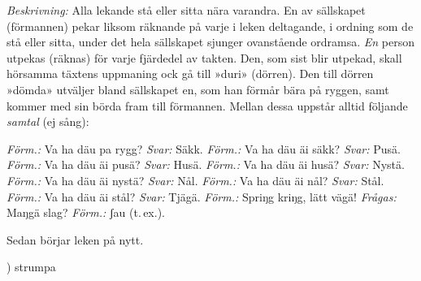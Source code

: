 \vspace{10mm}

\textit{Beskrivning:} Alla lekande stå eller sitta nära varandra. En
av sällskapet (förmannen) pekar liksom räknande på varje i leken
deltagande, i ordning som de stå eller sitta, under det hela sällskapet
sjunger ovanstående ordramsa. \textit{En} person utpekas (räknas)
för varje fjärdedel av takten. Den, som sist blir utpekad, skall
hörsamma täxtens uppmaning ock gå till »duri» (dörren). Den
till dörren »dömda» utväljer bland sällskapet en, som han förmår
bära på ryggen, samt kommer med sin börda fram till förmannen.
Mellan dessa uppstår alltid följande \textit{samtal} (ej sång):

\begin{multicols}{2}
\begin{flushleft}
\textit{Förm.:} Va ha däu pa rygg?\break
\textit{Svar:} Säkk.\break
\textit{Förm.:} Va ha däu äi säkk?\break
\textit{Svar:} Pusä.\break
\textit{Förm.:} Va ha däu äi pusä?\break
\textit{Svar:} Husä.\break
\textit{Förm.:} Va ha däu äi husä?\break
\textit{Svar:} Nystä.\break
\textit{Förm.:} Va ha däu äi nystä?\break
\textit{Svar:} Nål.\break
\textit{Förm.:} Va ha däu äi nål?\break
\textit{Svar:} Stål.\break
\textit{Förm.:} Va ha däu äi stål?\break
\textit{Svar:} Tjägä.\break
\textit{Förm.:} Spriŋg kriŋg, lätt vägä!\break
\textit{Frågas:} Maŋgä slag?\break
\textit{Förm.:} ʃau (t.\,ex.).
\end{flushleft}
\end{multicols}


\vspace{2mm}

Sedan börjar leken på nytt.

\vspace{5mm}

) strumpa
\vspace{5mm}
